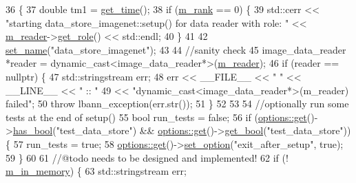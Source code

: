 \begin{DoxyCode}
36                                 \{
37   \textcolor{keywordtype}{double} tm1 = \hyperlink{namespacelbann_a478d36031ff0659893c4322cd856157f}{get\_time}();
38   \textcolor{keywordflow}{if} (\hyperlink{classlbann_1_1generic__data__store_a87695bfd2d1ed0dbe01d99108e3f68b7}{m\_rank} == 0) \{
39     std::cerr << \textcolor{stringliteral}{"starting data\_store\_imagenet::setup() for data reader with role: "} << 
      \hyperlink{classlbann_1_1generic__data__store_afa49ced0ab64c632371ea52532a91ec2}{m\_reader}->\hyperlink{classlbann_1_1generic__data__reader_a92982e1b399f37e2ead5aa440883cba5}{get\_role}() << std::endl;
40   \}
41 
42   \hyperlink{classlbann_1_1generic__data__store_a853741295a07b5687921fc56d0d7d5b2}{set\_name}(\textcolor{stringliteral}{"data\_store\_imagenet"});
43 
44   \textcolor{comment}{//sanity check}
45   image\_data\_reader *reader = \textcolor{keyword}{dynamic\_cast<}image\_data\_reader*\textcolor{keyword}{>}(\hyperlink{classlbann_1_1generic__data__store_afa49ced0ab64c632371ea52532a91ec2}{m\_reader});
46   \textcolor{keywordflow}{if} (reader == \textcolor{keyword}{nullptr}) \{
47     std::stringstream err;
48     err << \_\_FILE\_\_ << \textcolor{stringliteral}{" "} << \_\_LINE\_\_ << \textcolor{stringliteral}{" :: "}
49         << \textcolor{stringliteral}{"dynamic\_cast<image\_data\_reader*>(m\_reader) failed"};
50     \textcolor{keywordflow}{throw} lbann\_exception(err.str());
51   \}
52 
53 
54   \textcolor{comment}{//optionally run some tests at the end of setup()}
55   \textcolor{keywordtype}{bool} run\_tests = \textcolor{keyword}{false};
56   \textcolor{keywordflow}{if} (\hyperlink{classoptions_a9ecfe9c365269df68a41b961c31ae3f5}{options::get}()->\hyperlink{classoptions_aafb1d2a7ccde0b1bf786230ba4080ecd}{has\_bool}(\textcolor{stringliteral}{"test\_data\_store"}) && 
      \hyperlink{classoptions_a9ecfe9c365269df68a41b961c31ae3f5}{options::get}()->\hyperlink{classoptions_a99aa190102de33e2aed39723929f9fad}{get\_bool}(\textcolor{stringliteral}{"test\_data\_store"})) \{
57     run\_tests = \textcolor{keyword}{true};
58     \hyperlink{classoptions_a9ecfe9c365269df68a41b961c31ae3f5}{options::get}()->\hyperlink{classoptions_a3c23831e4218f9a88cddc81337518046}{set\_option}(\textcolor{stringliteral}{"exit\_after\_setup"}, \textcolor{keyword}{true});
59   \}
60 
61   \textcolor{comment}{//@todo needs to be designed and implemented!}
62   \textcolor{keywordflow}{if} (! \hyperlink{classlbann_1_1generic__data__store_a1a9cc7b097cd7dd6ae0d12d52bb43ea1}{m\_in\_memory}) \{
63     std::stringstream err;

\end{DoxyCode}
